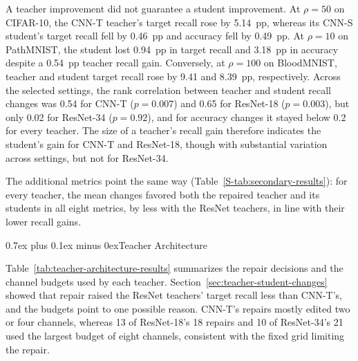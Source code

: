 \documentclass[10pt,journal,compsoc]{IEEEtran}
\makeatletter
\def\subsection{\@startsection{subsection}{2}{\z@}{-3.5ex plus -0.5ex minus -1.5ex}%
{0.7ex plus 0.1ex minus 0ex}{\normalfont\normalsize\sffamily\bfseries}}
\theoremstyle{definition}
\makeatother
\begin{document}
A teacher improvement did not guarantee a student improvement. At
$\rho=50$ on CIFAR-10, the CNN-T teacher's target recall rose by
5.14~pp, whereas its CNN-S student's target recall fell by 0.46~pp and
accuracy fell by 0.49~pp. At $\rho=10$ on PathMNIST, the student lost
0.94~pp in target recall and 3.18~pp in accuracy despite a 0.54~pp
teacher recall gain. Conversely, at $\rho=100$ on BloodMNIST, teacher
and student target recall rose by 9.41 and 8.39~pp, respectively.
Across the selected settings, the rank correlation
between teacher and student recall changes was 0.54 for CNN-T
($p=0.007$) and 0.65 for ResNet-18 ($p=0.003$), but only 0.02 for
ResNet-34 ($p=0.92$), and for accuracy changes it stayed below 0.2 for
every teacher. The size of a teacher's recall gain therefore indicates
the student's gain for CNN-T and ResNet-18, though with substantial
variation across settings, but not for ResNet-34.

The additional metrics point the
same way (Table~\ref{S-tab:secondary-results}): for every teacher, the
mean changes favored both the repaired teacher and its students in all
eight metrics, by less with the ResNet teachers, in line with their
lower recall gains.

\FloatBarrier
\vspace{-5pt}
\subsection{Teacher Architecture}
\label{sec:teacher-architecture}

Table~\ref{tab:teacher-architecture-results} summarizes the repair
decisions and the channel budgets used by each teacher.
Section~\ref{sec:teacher-student-changes} showed that repair raised the
ResNet teachers' target recall less than CNN-T's, and the budgets point
to one possible reason. CNN-T's repairs mostly edited two or four
channels, whereas 13 of ResNet-18's 18 repairs and 10 of ResNet-34's 21
used the largest budget of eight channels, consistent with the fixed
grid limiting the repair.
\end{document}
